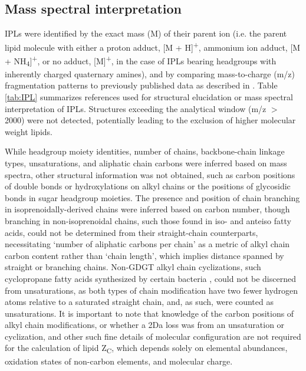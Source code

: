 \subsection{Mass spectral interpretation} IPLs were identified by the exact mass (M) of their parent ion (i.e. the parent lipid molecule with either a proton adduct, [M + H]\textsuperscript{+}, ammonium ion adduct, [M + NH\textsubscript{4}]\textsuperscript{+}, or no adduct, [M]\textsuperscript{+}, in the case of IPLs bearing headgroups with inherently charged quaternary amines), and by comparing mass-to-charge (m/z) fragmentation patterns to previously published data as described in \cite{Sturt_Intact_2004}. Table \ref{tab:IPL} summarizes references used for structural elucidation or mass spectral interpretation of IPLs. Structures exceeding the analytical window (m/z $>$ 2000) were not detected, potentially leading to the exclusion of higher molecular weight lipids.

While headgroup moiety identities, number of chains, backbone-chain linkage types, unsaturations, and aliphatic chain carbons were inferred based on mass spectra, other structural information was not obtained, such as carbon positions of double bonds or hydroxylations on alkyl chains or the positions of glycosidic bonds in sugar headgroup moieties. The presence and position of chain branching in isoprenoidally-derived chains were inferred based on carbon number, though branching in non-isoprenoidal chains, such those found in iso- and anteiso fatty acids, could not be determined from their straight-chain counterparts, necessitating `number of aliphatic carbons per chain' as a metric of alkyl chain carbon content rather than `chain length', which implies distance spanned by straight or branching chains. Non-GDGT alkyl chain cyclizations, such cyclopropane fatty acids synthesized by certain bacteria \citep{grogan1997cyclopropane}, could not be discerned from unsaturations, as both types of chain modification have two fewer hydrogen atoms relative to a saturated straight chain, and, as such, were counted as unsaturations. It is important to note that knowledge of the carbon positions of alkyl chain modifications, or whether a 2Da loss was from an unsaturation or cyclization, and other such fine details of molecular configuration are not required for the calculation of lipid Z\textsubscript{C}, which depends solely on elemental abundances, oxidation states of non-carbon elements, and molecular charge.

